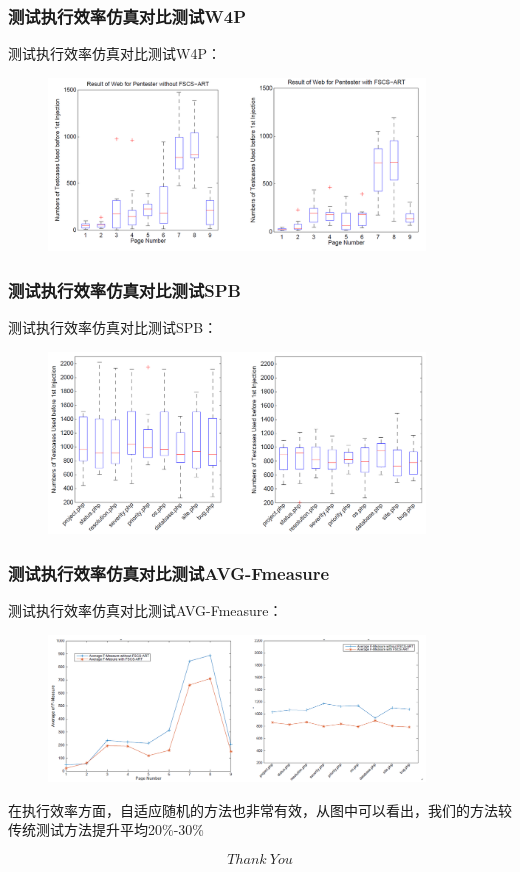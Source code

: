 \documentclass{beamer}
\begin{document}
\begin{CJK*}{UTF8}{}
\begin{frame}
\frametitle{测试执行效率仿真对比测试W4P}
测试执行效率仿真对比测试W4P：\\
\begin{figure}  
 \centering  
 \includegraphics[width=100mm]{7.png}\\  
\end{figure}
\end{frame}
\begin{frame}
\frametitle{测试执行效率仿真对比测试SPB}
测试执行效率仿真对比测试SPB：\\
\begin{figure}  
 \centering  
 \includegraphics[width=100mm]{8.png}\\  
\end{figure}
\end{frame}

\begin{frame}
\frametitle{测试执行效率仿真对比测试AVG-Fmeasure}
测试执行效率仿真对比测试AVG-Fmeasure：\\
\begin{figure}  
 \centering  
 \includegraphics[width=100mm]{9.png}\\  
\end{figure}
在执行效率方面，自适应随机的方法也非常有效，从图中可以看出，我们的方法较传统测试方法提升平均20\%-30\%
\end{frame}
\begin{frame}
$$Thank ~You$$
\end{frame}
\begin{frame}
\titlepage %
\end{frame}


\end{CJK*}
\end{document}
